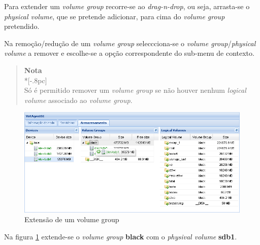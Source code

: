 Para extender um \emph{volume group} recorre-se ao \emph{drag-n-drop}, ou seja, arrasta-se o \emph{physical volume}, que se pretende adicionar, para cima do \emph{volume group} pretendido.

Na remoção/redução de um \emph{volume group} seleccciona-se o \emph{volume group}/\emph{physical volume} a remover e escolhe-se a opção correspondente do sub-menu de contexto.
\begin{quote}
	{\large \bf Nota} \\*[-.8pc]
	\underline{\hspace{6in}} \\
	Só é permitido remover um \emph{volume group} se não houver nenhum \emph{logical volume} associado ao \emph{volume group}.
\end{quote}
 
\begin{figure}[H]
        \begin{center}
        \includegraphics[scale=0.45]{screenshots/storage_vg_extend.png}
        \caption{Extensão de um volume group}
        \label{fig:storage_vg_extend}
        \end{center}
\end{figure}

Na figura \ref{fig:storage_vg_extend} extende-se o \emph{volume group} {\bf black} com o \emph{physival volume} {\bf sdb1}.

